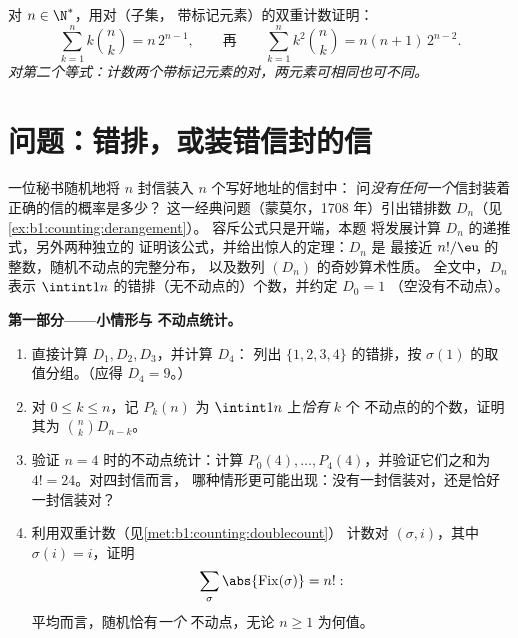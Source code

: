 \begin{exercise}[$\star\star\star$]\label{exo:b1:counting:12}
对 $n \in \N^*$，用对（子集，
带标记元素）的双重计数证明：
\[
\sum_{k=1}^{n} k \binom{n}{k} = n\, 2^{n-1},
\qquad\text{再}\qquad
\sum_{k=1}^{n} k^2 \binom{n}{k} = n(n+1)\, 2^{n-2} .
\]
\emph{对第二个等式：计数两个带标记元素的对，两元素可相同也可不同。}
\end{exercise}

\section{问题：错排，或装错信封的信}

\begin{problem}\label{pb:b1:counting:1}
一位秘书随机地将 $n$ 封信装入 $n$ 个写好地址的信封中：
问\emph{没有任何一个}信封装着正确的信的概率是多少？
这一经典问题（蒙莫尔，1708 年）引出错排数
$D_n$（见\cref{ex:b1:counting:derangement}）。
容斥公式只是开端，本题
将发展计算 $D_n$ 的递推式，另外两种独立的
证明该公式，并给出惊人的定理：$D_n$ 是
最接近 $n!/\eu$ 的整数，随机不动点的完整分布，
以及数列
$(D_n)$ 的奇妙算术性质。
全文中，$D_n$ 表示
$\intint1n$ 的错排（无不动点的）个数，并约定 $D_0 = 1$
（空没有不动点）。

\medskip
\noindent\textbf{第一部分——小情形与
不动点统计。}
\begin{enumerate}
  \item 直接计算 $D_1, D_2, D_3$，并计算 $D_4$：
        列出 $\{1, 2, 3, 4\}$ 的错排，按
        $\sigma(1)$ 的取值分组。（应得 $D_4 = 9$。）
  \item 对 $0 \leq k \leq n$，记 $P_k(n)$ 为
        $\intint1n$ 上\emph{恰有} $k$ 个
        不动点的的个数，证明其为 $\binom nk D_{n-k}$。
  \item 验证 $n = 4$ 时的不动点统计：计算 $P_0(4), \dots,
        P_4(4)$，并验证它们之和为 $4! = 24$。对四封信而言，
        哪种情形更可能出现：没有一封信装对，还是恰好一封信装对？
  \item 利用双重计数（见\cref{met:b1:counting:doublecount}）
        计数对 $(\sigma, i)$，其中 $\sigma(i) = i$，证明
        \[
        \sum_{\sigma} \abs{\mathrm{Fix}(\sigma)} = n! :
        \]
        平均而言，随机恰有\emph{一个}
        不动点，无论 $n \geq 1$ 为何值。
\end{enumerate}


\end{problem}
